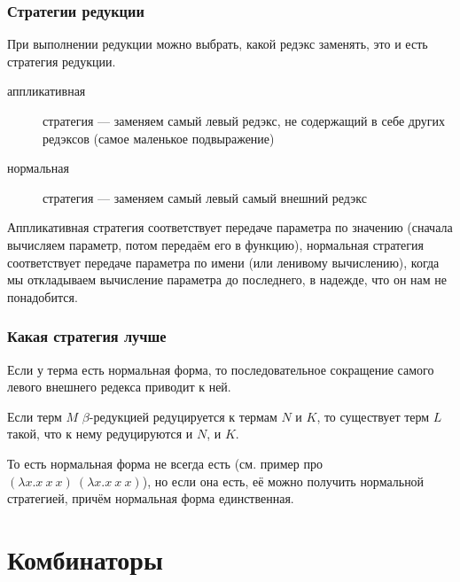 \documentclass{../../slides-style}
\begin{document}
    \begin{frame}
        \frametitle{Стратегии редукции}
        При выполнении редукции можно выбрать, какой редэкс заменять, это и есть стратегия редукции.
        \begin{description}
            \item[аппликативная] стратегия --- заменяем самый левый редэкс, не содержащий в себе других 
                    редэксов (самое маленькое подвыражение)
            \item[нормальная] стратегия --- заменяем самый левый самый внешний редэкс
        \end{description}
        Аппликативная стратегия соответствует передаче параметра по значению (сначала вычисляем параметр, потом 
        передаём его в функцию), нормальная стратегия соответствует передаче параметра по имени (или ленивому вычислению),
        когда мы откладываем вычисление параметра до последнего, в надежде, что он нам не понадобится.
    \end{frame}

    \begin{frame}
        \frametitle{Какая стратегия лучше}
        \begin{rustheorem}
            Если у терма есть нормальная форма, то последовательное сокращение самого левого внешнего 
            редекса приводит к ней.
        \end{rustheorem}
        \begin{rustheorem}
            Если терм $M$ $\beta$-редукцией редуцируется к термам $N$ и $K$, то существует терм $L$ такой, что
            к нему редуцируются и $N$, и $K$.
        \end{rustheorem}
        \vspace{1cm}
        То есть нормальная форма не всегда есть (см. пример про $(\lambda x.x\ x\ x)\ (\lambda x.x\ x\ x)$), но
        если она есть, её можно получить нормальной стратегией, причём нормальная форма единственная.
    \end{frame}

    \section{Комбинаторы}
\end{document}
